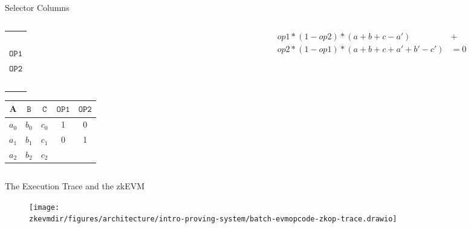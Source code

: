 \begin{frame}{Selector Columns}
\begin{columns}
\begin{column}{0.48\textwidth}
\begin{table}[h!]
\begin{tabular}{c}
$             $ \\
$\mathtt{OP1}$ \\
$\mathtt{OP2}$ \\
$             $
\end{tabular}
\begin{tabular}{|c|c|c|c|c|}\hline
$\mathbf{A}$ & $\mathtt{B}$ & $\mathtt{C}$ & $\mathtt{OP1}$ & $\mathtt{OP2}$ \\ \hline
$a_0$ & $b_0$ & $c_0$ & 1 & 0 \\ \hline
$a_1$ & $b_1$ & $c_1$ & 0 & 1\\ \hline
$a_2$ & $b_2$ & $c_2$ & & \\ \hline
\end{tabular}
\end{table}
\end{column}
\begin{column}{0.48\textwidth}
\begin{align*}
op1*(1-op2)*(a+b+c-a') &+  \\
op2*(1-op1)*(a+b+c+a'+b'-c') &= 0
\end{align*}
\end{column}
\end{columns}
\end{frame}
\fi




\begin{frame}{The Execution Trace and the zkEVM}
\begin{figure}
\texttt{[image: \\zkevmdir/figures/architecture/intro-proving-system/batch-evmopcode-zkop-trace.drawio]}
\end{figure}
\end{frame}




